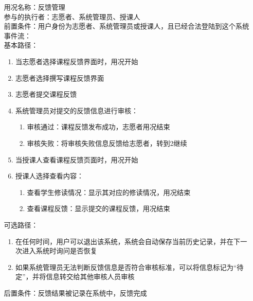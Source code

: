 \begin{framed}
\noindent
用况名称：反馈管理\\
参与的执行者：志愿者、系统管理员、授课人\\
前置条件：用户身份为志愿者、系统管理员或授课人，且已经合法登陆到这个系统\\
事件流：\\
基本路径：
\begin{enumerate}[itemsep=2pt,topsep=0pt,parsep=0pt,itemindent=1em]
    \item 当志愿者选择课程反馈界面时，用况开始
    \item 志愿者选择撰写课程反馈界面
    \item 志愿者提交课程反馈
    \item 系统管理员对提交的反馈信息进行审核：
    \begin{enumerate}[itemsep=2pt,topsep=0pt,parsep=0pt,itemindent=1em]
          \item 审核通过：课程反馈发布成功，志愿者用况结束
          \item 审核失败：将审核失败信息反馈给志愿者，转到2继续
      \end{enumerate}
    \item 当授课人查看课程反馈页面时，用况开始
    \item 授课人选择查看内容：
    \begin{enumerate}[itemsep=2pt,topsep=0pt,parsep=0pt,itemindent=1em]
          \item 查看学生修读情况：显示其对应的修读情况，用况结束
          \item 查看课程反馈：显示提交的课程反馈，用况结束
      \end{enumerate}
\end{enumerate}
\noindent
可选路径：\par
         \begin{enumerate}[itemsep=2pt,topsep=0pt,parsep=0pt,itemindent=1em]  \item 在任何时间，用户可以退出该系统，系统会自动保存当前历史记录，并在下一次进入系统时询问是否恢复 
         \item 如果系统管理员无法判断反馈信息是否符合审核标准，可以将信息标记为“待定”，并将信息转交给其他审核人员审核  \end{enumerate}
后置条件：反馈结果被记录在系统中，反馈完成

\end{framed}
